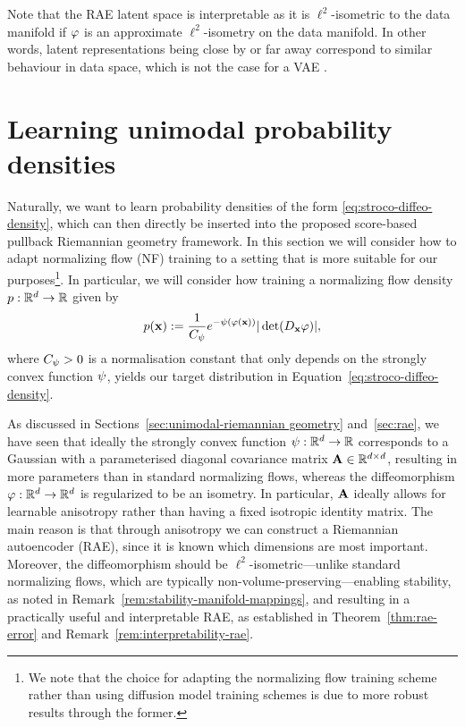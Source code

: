 \begin{remark}
\label{rem:interpretability-rae}
    Note that the RAE latent space is interpretable as it is $\ell^2$-isometric to the data manifold if $\varphi$ is an approximate $\ell^2$-isometry on the data manifold. In other words, latent representations being close by or far away correspond to similar behaviour in data space, which is not the case for a VAE \cite{kingma2013auto}.
\end{remark}

\section{Learning unimodal probability densities }
\label{sec:adapting-normalising-flows}

Naturally, we want to learn probability densities of the form \ref{eq:stroco-diffeo-density}, which can then directly be inserted into the proposed score-based pullback Riemannian geometry framework. In this section we will consider how to adapt normalizing flow (NF) \cite{dinh2017density} training to a setting that is more suitable for our purposes\footnote{We note that the choice for adapting the normalizing flow training scheme rather than using diffusion model training schemes is due to more robust results through the former.}. In particular, we will consider how training a normalizing flow density $p: \mathbb{R}^d\to\mathbb{R}$ given by 
\begin{equation}
    p(\mathbf{x}):= \frac{1}{C_{\psi}}e^{- \psi(\varphi(\mathbf{x}))} |\det(D_{\mathbf{x}} \varphi)|,
    \label{eq:nf-density}
\end{equation}
where $C_{\psi}>0$ is a normalisation constant that only depends on the strongly convex function $\psi$, yields our target distribution in Equation~\ref{eq:stroco-diffeo-density}.

As discussed in Sections~\ref{sec:unimodal-riemannian geometry} and~\ref{sec:rae}, we have seen that ideally the strongly convex function $\psi: \mathbb{R}^{d} \to \mathbb{R}$ corresponds to a Gaussian with a parameterised diagonal covariance matrix $\mathbf{A} \in \mathbb{R}^{d\times d}$, resulting in more parameters than in standard normalizing flows, whereas the diffeomorphism $\varphi: \mathbb{R}^{d} \to \mathbb{R}^{d}$ is regularized to be an isometry. In particular, $\mathbf{A}$ ideally allows for learnable anisotropy rather than having a fixed isotropic identity matrix. The main reason is that through anisotropy we can construct a Riemannian autoencoder (RAE), since it is known which dimensions are most important. Moreover, the diffeomorphism should be $\ell^2$-isometric—unlike standard normalizing flows, which are typically non-volume-preserving—enabling stability, as noted in Remark~\ref{rem:stability-manifold-mappings}, and resulting in a practically useful and interpretable RAE, as established in Theorem~\ref{thm:rae-error} and Remark~\ref{rem:interpretability-rae}.
 

